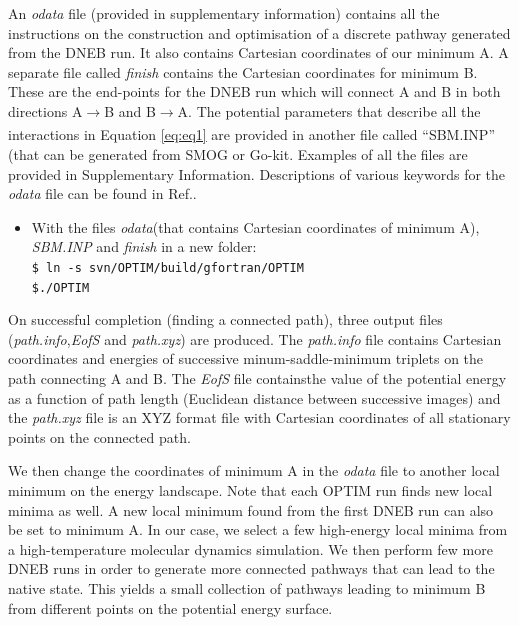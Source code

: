 \documentclass[journal=jacsat]{achemso}
\begin{document}
An \emph{odata} file (provided in supplementary information) contains all the instructions on the construction and optimisation of a discrete pathway generated from the DNEB run. It also contains Cartesian coordinates of our minimum A. A separate file called \emph{finish} contains the Cartesian coordinates for minimum B. These are the end-points for the DNEB run which will connect A and B in both directions A$\xrightarrow[]{}$B and B$\xrightarrow[]{}$A. The potential parameters that describe all the interactions in Equation \ref{eq:eq1} are provided in another file called ``SBM.INP'' (that can be generated from SMOG\cite{smog} or Go-kit\cite{Neelamraju19a}. Examples of all the files are provided in Supplementary Information. Descriptions of various keywords for the \emph{odata} file can be found in Ref.\cite{OPTIM}. 

\begin{itemize}
\small
\item{With the files \emph{odata}(that contains Cartesian coordinates of minimum A), \emph{SBM.INP} and \emph{finish} in a new  folder: \\ \tt{\$ ln -s svn/OPTIM/build/gfortran/OPTIM} \\ \tt{\$./OPTIM}}

\end{itemize}

On successful completion (finding a connected path), three output files (\emph{path.info},\emph{EofS} and \emph{path.xyz}) are produced. The \emph{path.info} file contains Cartesian coordinates and energies of successive minum-saddle-minimum triplets on the path connecting A and B. The \emph{EofS} file containsthe value of the potential energy as a function of path length (Euclidean distance between successive images) and the \emph{path.xyz} file is an XYZ format file with Cartesian coordinates of all stationary points on the connected path. 

We then change the coordinates of minimum A in the \emph{odata} file to another local minimum on the energy landscape. Note that each OPTIM run finds new local minima as well. A new local minimum found from the first DNEB run can also be set to minimum A. In our case, we select a few high-energy local minima from a high-temperature molecular dynamics simulation. We then perform few more DNEB runs in order to generate more connected pathways that can lead to the native state. This yields a small collection of pathways leading to minimum B from different points on the potential energy surface. 
\end{document}
